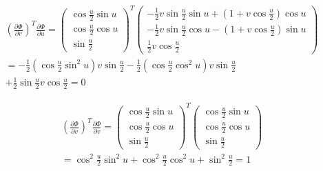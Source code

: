 {\begin{equation}
\begin{split}
(\frac{\partial \Phi }{\partial v})^{T}\frac{\partial \Phi }{\partial u}
=  \allowbreak
\begin{pmatrix}
\cos \frac{u}{2}\sin u \\
\cos \frac{u}{2}\cos u \\
\sin \frac{u}{2}
\end{pmatrix}^{T}
\begin{pmatrix}
-\frac{1}{2}v\sin \frac{u}{2}\sin u+\left( 1+v\cos \frac{u}{2}\right) \cos u \\
-\frac{1}{2}v\sin \frac{u}{2}\cos u-\left( 1+v\cos \frac{u}{2}\right) \sin u \\
\frac{1}{2}v\cos \frac{u}{2}
\end{pmatrix}
\\
=
-\frac{1}{2}\left( \cos \frac{u}{2}\sin ^{2}u\right) v\sin \frac{u}{2}-%
\frac{1}{2}\left( \cos \frac{u}{2}\cos ^{2}u\right) v\sin \frac{u}{2}
\\
+%
\frac{1}{2}\sin \frac{u}{2} v\cos \frac{u}{2}=\allowbreak 0
\end{split}
\end{equation}

\begin{equation}
\begin{split}
(\frac{\partial \Phi }{\partial v})^{T}\frac{\partial \Phi }{\partial v}
=\allowbreak
\begin{pmatrix}
\cos \frac{u}{2}\sin u \\
\cos \frac{u}{2}\cos u \\
\sin \frac{u}{2}
\end{pmatrix}^{T}
\begin{pmatrix}
\cos \frac{u}{2}\sin u \\
\cos \frac{u}{2}\cos u \\
\sin \frac{u}{2}
\end{pmatrix}
 \\
=
\cos ^{2}\frac{u}{2}\sin ^{2}u+\cos ^{2}\frac{u}{2}\cos ^{2}u+\sin ^{2}%
\frac{u}{2}=\allowbreak 1
\end{split}
\end{equation}


}
